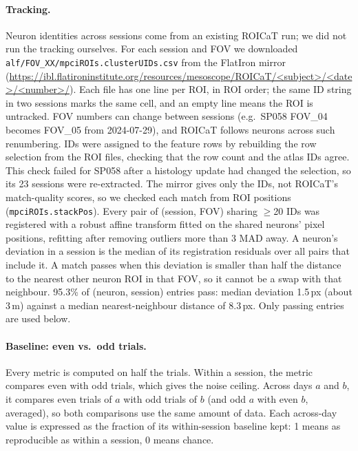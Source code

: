 \documentclass[10pt,a4paper]{article}
\begin{document}
\paragraph{Tracking.}
Neuron identities across sessions come from an existing ROICaT run; we did not run the tracking ourselves.
For each session and FOV we downloaded \texttt{alf/FOV\_XX/mpciROIs.clusterUIDs.csv} from the FlatIron mirror
(\url{https://ibl.flatironinstitute.org/resources/mesoscope/ROICaT/<subject>/<date>/<number>/}).
Each file has one line per ROI, in ROI order; the same ID string in two sessions marks the same cell, and an empty line means the ROI is untracked.
FOV numbers can change between sessions (e.g.\ SP058 FOV\_04 becomes FOV\_05 from 2024-07-29), and ROICaT follows neurons across such renumbering.
IDs were assigned to the feature rows by rebuilding the row selection from the ROI files, checking that the row count and the atlas IDs agree.
This check failed for SP058 after a histology update had changed the selection, so its 23 sessions were re-extracted.
The mirror gives only the IDs, not ROICaT's match-quality scores, so we checked each match from ROI positions (\texttt{mpciROIs.stackPos}).
Every pair of (session, FOV) sharing $\geq$20 IDs was registered with a robust affine transform fitted on the shared neurons' pixel positions, refitting after removing outliers more than 3 MAD away.
A neuron's deviation in a session is the median of its registration residuals over all pairs that include it.
A match passes when this deviation is smaller than half the distance to the nearest other neuron ROI in that FOV, so it cannot be a swap with that neighbour.
95.3\% of (neuron, session) entries pass: median deviation 1.5\,px (about 3\,\textmu m) against a median nearest-neighbour distance of 8.3\,px.
Only passing entries are used below.

\paragraph{Baseline: even vs.\ odd trials.}
Every metric is computed on half the trials.
Within a session, the metric compares even with odd trials, which gives the noise ceiling.
Across days $a$ and $b$, it compares even trials of $a$ with odd trials of $b$ (and odd $a$ with even $b$, averaged), so both comparisons use the same amount of data.
Each across-day value is expressed as the fraction of its within-session baseline kept: 1 means as reproducible as within a session, 0 means chance.
\end{document}
